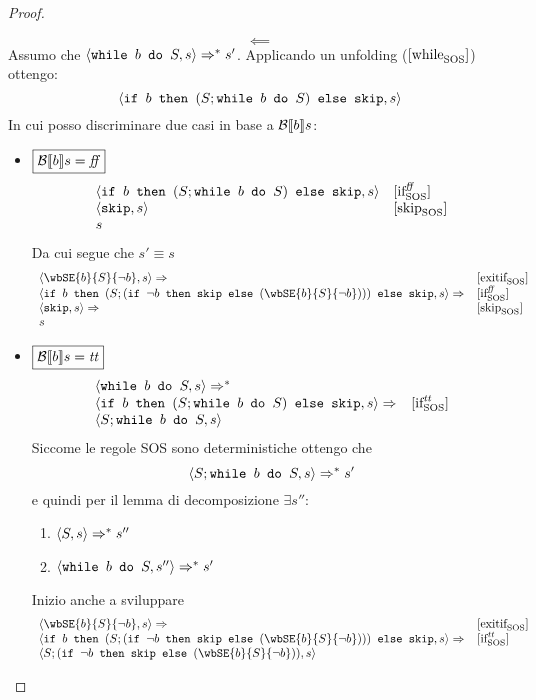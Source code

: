 {\begin{enumerate}
\begin{proof}
\begin{itemize}
\end{itemize}
$$
\boxed{\impliedby}
$$
Assumo che $\confSs{\wbS{b}{S}}{s} \Rar{*} s'$. Applicando un unfolding ($\whileSOS$) ottengo:
$$
\confSs{\ifABC{b}{(S; \wbS{b}{S})}{\skipForFriends}}{s}
$$
In cui posso discriminare due casi in base a $\B{b}$:
\begin{itemize}
\item $\boxed{\B{b} = \semfalse}$
$$
\begin{array}{ll}
\confSs{\ifABC{b}{(S; \wbS{b}{S})}{\skipForFriends}}{s} & \ifffSOS\\
\confSs{\skipForFriends}{s} & \skipSOS\\
s & \\
\end{array}
$$
Da cui segue che $\boxed{s' \equiv{ } s}$
$$
\begin{array}{ll}
\confSs{\wbSE{b}{S}{\neg b}}{s} \Rar{ } & \exitifSOS\\
\confSs{\ifABC{b}{(S; (\ifABC{\neg b}{\skipForFriends}{(\wbSE{b}{S}{\neg b})}))}{\skipForFriends}}{s} \Rar{} & \ifffSOS \\
\confSs{\skipForFriends}{s} \Rar{}& \skipSOS\\
s & \\
\end{array}
$$
\item $\boxed{\B{b} = \semtrue}$
$$
\begin{array}{ll}
\confSs{\wbS{b}{S}}{s} \Rar{*} & \\ 
\confSs{\ifABC{b}{(S; \wbS{b}{S})}{\skipForFriends}}{s} \Rar{} & \ifttSOS\\
\confSs{S; \wbS{b}{S}}{s} & \\
\end{array}
$$	
Siccome le regole SOS sono deterministiche ottengo che
$$
\confSs{S; \wbS{b}{S}}{s} \Rar{*} s'
$$
e quindi per il lemma di decomposizione $\exists s''$:
\begin{enumerate}
\item 
$\confSs{S}{s} \Rar{*} s''$
\label{hw6:FattoA}
\item $\confSs{\wbS{b}{S}}{s''} \Rar{*} s' $
\label{hw6:FattoB}
\end{enumerate}
Inizio anche a sviluppare 
$$
\begin{array}{ll}
	\confSs{\wbSE{b}{S}{\neg b}}{s} \Rar{ } & \exitifSOS\\
	\confSs{\ifABC{b}{(S; (\ifABC{\neg b}{\skipForFriends}{(\wbSE{b}{S}{\neg b})}))}{\skipForFriends}}{s} \Rar{} & \ifttSOS \\
	\confSs{S; (\ifABC{\neg b}{\skipForFriends}{(\wbSE{b}{S}{\neg b})})}{s} & \\

\end{array}$$
\end{itemize}
\end{proof}
\end{enumerate}}
